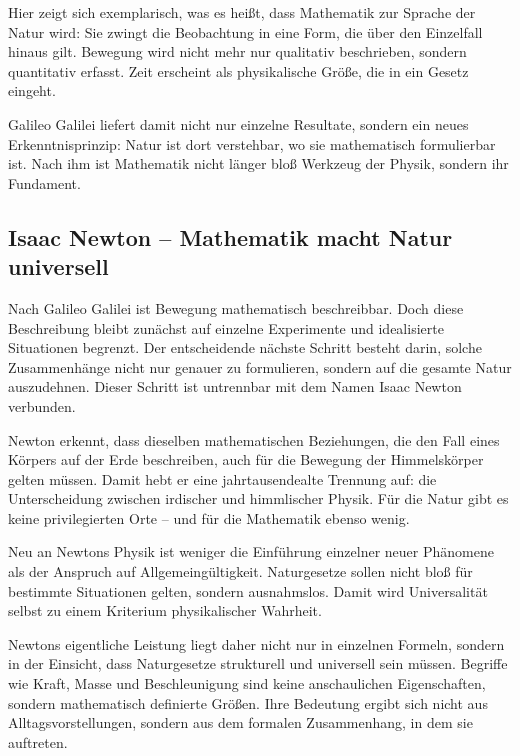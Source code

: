 Hier zeigt sich exemplarisch,
was es heißt, dass Mathematik zur Sprache der Natur wird:
Sie zwingt die Beobachtung in eine Form,
die über den Einzelfall hinaus gilt.
Bewegung wird nicht mehr nur qualitativ beschrieben,
sondern quantitativ erfasst.
Zeit erscheint als physikalische Größe,
die in ein Gesetz eingeht.

Galileo Galilei liefert damit nicht nur einzelne Resultate,
sondern ein neues Erkenntnisprinzip:
Natur ist dort verstehbar,
wo sie mathematisch formulierbar ist.
Nach ihm ist Mathematik
nicht länger bloß Werkzeug der Physik,
sondern ihr Fundament.

\subsection{Isaac Newton -- Mathematik macht Natur universell}

Nach Galileo Galilei ist Bewegung mathematisch beschreibbar.
Doch diese Beschreibung bleibt zunächst auf einzelne Experimente
und idealisierte Situationen begrenzt.
Der entscheidende nächste Schritt besteht darin,
solche Zusammenhänge nicht nur genauer zu formulieren,
sondern auf die gesamte Natur auszudehnen.
Dieser Schritt ist untrennbar mit dem Namen Isaac Newton verbunden.

Newton erkennt,
dass dieselben mathematischen Beziehungen,
die den Fall eines Körpers auf der Erde beschreiben,
auch für die Bewegung der Himmelskörper gelten müssen.
Damit hebt er eine jahrtausendealte Trennung auf:
die Unterscheidung zwischen irdischer und himmlischer Physik.
Für die Natur gibt es keine privilegierten Orte --
und für die Mathematik ebenso wenig.

\begin{HistoryBox}
	\label{box:gesetze}
	Neu an Newtons Physik ist weniger die Einführung einzelner neuer Phänomene
	als der Anspruch auf Allgemeingültigkeit.
	Naturgesetze sollen nicht bloß für bestimmte Situationen gelten,
	sondern ausnahmslos.
	Damit wird Universalität
	selbst zu einem Kriterium physikalischer Wahrheit.
\end{HistoryBox}

Newtons eigentliche Leistung liegt daher nicht nur in einzelnen Formeln,
sondern in der Einsicht,
dass Naturgesetze strukturell und universell sein müssen.
Begriffe wie Kraft, Masse
und Beschleunigung
sind keine anschaulichen Eigenschaften,
sondern mathematisch definierte Größen.
Ihre Bedeutung ergibt sich nicht aus Alltagsvorstellungen,
sondern aus dem formalen Zusammenhang,
in dem sie auftreten.

